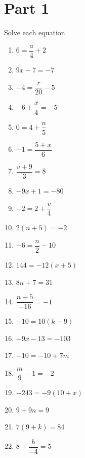 \documentclass[10pt]{article}
\theoremstyle{definition}
\theoremstyle{plain}
\numberwithin{equation}{section}
\begin{document}
\newpage





  \section*{Part 1}
    \begin{multicolblock}{Solve each equation.}
    \begin{enumerate}
      \item $6 = \dfrac{a}{4} + 2$
      \item $9x - 7 = -7$
      \item $-4 = \dfrac{r}{20} - 5$
      \item $-6 + \dfrac{x}{4} = -5$
      \item $0 = 4 + \dfrac{n}{5}$
      \item $-1 = \dfrac{5 + x}{6}$
    \item $\dfrac{v + 9}{3} = 8$
    \item $-9x + 1 = -80$
    \item $-2 = 2 + \dfrac{v}{4}$
    \item $2(n + 5) = -2$
    \item $-6 = \dfrac{n}{2} - 10$
    \item $144 = -12(x + 5)$
    \item $8n + 7 = 31$
    \item $\dfrac{n + 5}{-16} = -1$
    \item $-10 = 10(k - 9)$
    \item $-9x - 13 = -103$
    \item $-10 = -10 + 7m$
    \item $\dfrac{m}{9} - 1 = -2$
    \item $-243=-9(10+x)$
    \item $9+9 n=9$
    \item $7(9+k)=84$
    \item $8+\dfrac{b}{-4}=5$
  \end{enumerate}
\end{multicolblock}
\end{document}
